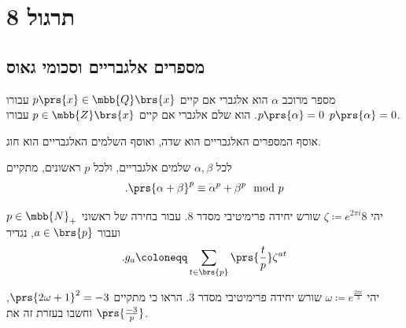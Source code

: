 \documentclass[a4paper,10pt,twoside,openany]{book}
\begin{document}
\chapter{תרגול 8}

\section{מספרים אלגבריים וסכומי גאוס}

\begin{definition}
מספר מרוכב
$\alpha$
הוא אלגברי אם קיים
$p\prs{x} \in \mbb{Q}\brs{x}$
עבורו
$p\prs{\alpha} = 0$.
הוא שלם אלגברי אם קיים
$p \in \mbb{Z}\brs{x}$
עבורו
$p\prs{\alpha} = 0$.
\end{definition}

\begin{proposition}
אוסף המספרים האלגבריים הוא שדה, ואוסף השלמים האלגבריים הוא חוג.
\end{proposition}

\begin{proposition}
לכל
$\alpha, \beta$
שלמים אלגבריים, ולכל
$p$
ראשונים, מתקיים
\begin{align*}
\text{.} \prs{\alpha + \beta}^p \equiv \alpha^p + \beta^p \mod{p}
\end{align*}
\end{proposition}

\begin{definition}
יהי
$\zeta \coloneqq e^{2 \pi i}{8}$
שורש יחידה פרימיטיבי מסדר 8.
עבור בחירה של ראשוני
$p \in \mbb{N}_+$
ועבור
$a \in \brs{p}$,
נגדיר
\begin{align*}
\text{.} g_a \coloneqq \sum_{t \in \brs{p}} \prs{\frac{t}{p}} \zeta^{at}
\end{align*}
\end{definition}

\begin{exercisechap}
יהי
$\omega \coloneqq e^{\frac{2 \pi i}{3}}$
שורש יחידה פרימיטיבי מסדר
$3$.
הראו כי מתקיים
$\prs{2 \omega + 1}^2 = -3$,
וחשבו בעזרת זה את
$\prs{\frac{-3}{p}}$.
\end{exercisechap}
\end{document}
